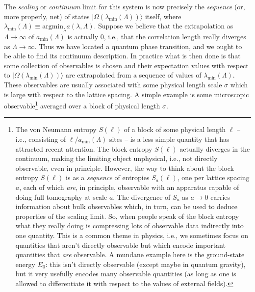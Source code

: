 \documentclass[11pt]{amsart}
\theoremstyle{plain}%
\theoremstyle{definition}
\theoremstyle{remark}
\begin{document}
The \emph{scaling} or \emph{continuum} limit for this system is now precisely the \emph{sequence} (or, more properly, net) of states $|\Omega(\lambda_{\text{min}}(\Lambda))\rangle$ itself, where  $\lambda_{\text{min}}(\Lambda) \equiv \text{argmin}_{\lambda} a(\lambda, \Lambda)$. Suppose we believe that the extrapolation as $\Lambda \rightarrow \infty$ of $a_{\text{min}}(\Lambda)$ is actually $0$, i.e., that the correlation length really diverges as $\Lambda\rightarrow \infty$. Thus we have located a quantum phase transition, and we ought to be able to find its continuum description. In practice what is then done is that some collection of observables is chosen and their expectation values with respect to $|\Omega(\lambda_{\text{min}}(\Lambda))\rangle$ are extrapolated from a sequence of values of $\lambda_{\text{min}}(\Lambda)$. These observables are usually associated with some physical length scale $\sigma$ which is large with respect to the lattice spacing. A simple example is some microscopic observable\footnote{The von Neumann entropy $S(\ell)$ of a block of some physical length $\ell$ -- i.e., consisting of $\ell/a_{\text{min}}(\Lambda)$ sites -- is a less simple quantity that has attracted recent attention. The block entropy $S(\ell)$ actually diverges in the continuum, making the limiting object unphysical, i.e., not directly observable, even in principle. However, the way to think about the block entropy $S(\ell)$ is as a \emph{sequence} of entropies $S_a(\ell)$, one per lattice spacing $a$, each of which \emph{are}, in principle, observable with an apparatus capable of doing full tomography at scale $a$. The divergence of $S_a$ as $a\rightarrow 0$ carries information about bulk observables which, in turn, can be used to deduce properties of the scaling limit. So, when people speak of the block entropy what they really doing is compressing lots of observable data indirectly into one quantity. This is a common theme in physics, i.e., we sometimes focus on quantities that aren't directly observable but which encode important quantities that \emph{are} observable. A mundane example here is the ground-state energy $E_0$: this isn't directly observable (except maybe in quantum gravity), but it very usefully encodes many observable quantities (as long as one is allowed to differentiate it with respect to the values of external fields).} averaged over a block of physical length $\sigma$.  
\end{document}
